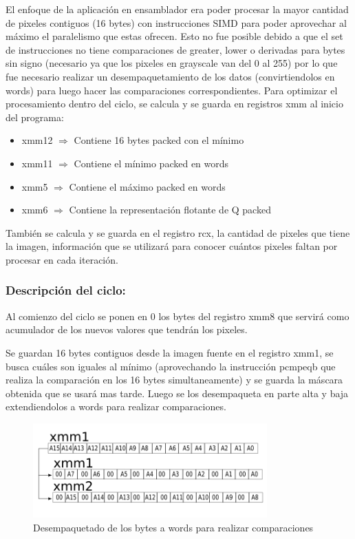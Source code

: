 El enfoque de la aplicación en ensamblador era poder procesar la mayor cantidad de pixeles contiguos (16 bytes) con instrucciones SIMD para poder aprovechar al máximo el paralelismo que estas ofrecen. Esto no fue posible debido a que el set de instrucciones no tiene comparaciones de greater, lower o derivadas para bytes sin signo (necesario ya que los pixeles en grayscale van del 0 al 255) por lo que fue necesario realizar un desempaquetamiento de los datos (convirtiendolos en words) para luego hacer las comparaciones correspondientes.
Para optimizar el procesamiento dentro del ciclo, se calcula y se guarda en registros xmm al inicio del programa:
\begin{itemize}
  \item xmm12 $\Rightarrow$ Contiene 16 bytes packed con el mínimo
  \item xmm11 $\Rightarrow$ Contiene el mínimo packed en words
  \item xmm5 $\Rightarrow$ Contiene el máximo packed en words
  \item xmm6 $\Rightarrow$ Contiene la representación flotante de Q packed
\end{itemize}

También se calcula y se guarda en el registro rcx, la cantidad de pixeles que tiene la imagen, información que se utilizará para conocer cuántos pixeles faltan por procesar en cada iteración.

\subsubsection{Descripción del ciclo:}
Al comienzo del ciclo se ponen en 0 los bytes del registro xmm8 que servirá como acumulador de los nuevos valores que tendrán los pixeles.

Se guardan 16 bytes contiguos desde la imagen fuente en el registro xmm1, se busca cuáles son iguales al mínimo (aprovechando la instrucción pcmpeqb que realiza la comparación en los 16 bytes simultaneamente) y se guarda la máscara obtenida que se usará mas tarde. Luego se los desempaqueta en parte alta y baja extendiendolos a words para realizar comparaciones.

\begin{figure}[H]
\centering
\includegraphics[width=90mm]{unpackxmm1.png}
\caption{Desempaquetado de los bytes a words para realizar comparaciones}
\label{overflow}
\end{figure}

